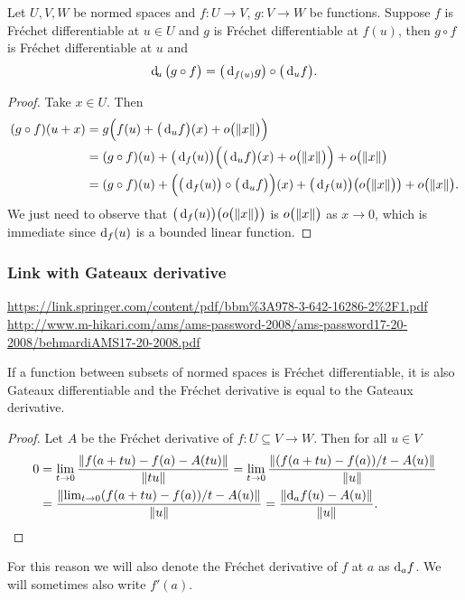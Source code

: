 \begin{proposition} \label{FrechetChainRule}
Let $U,V,W$ be normed spaces and $f: U\to V$, $g: V\to W$ be functions. Suppose $f$ is Fréchet differentiable at $u\in U$ and $g$ is Fréchet differentiable at $f(u)$, then $g\circ f$ is Fréchet differentiable at $u$ and
\[ \operatorname{d \!}_{u}\big(g\circ f\big) = \big(\operatorname{d \!}{_{f(u)}}g\big) \circ \big(\operatorname{d \!}{_u}f\big). \]
\end{proposition}
\begin{proof}
Take $x\in U$. Then
\begin{align*}
(g\circ f)(u+x) &= g\Big(f(u) + \big(\operatorname{d \!}{_uf}\big)(x) + o\big(\lVert x\rVert\big)\Big) \\
&= (g\circ f)(u) + \big(\operatorname{d \!}{_f(u)}\big)\Big(\big(\operatorname{d \!}{_uf}\big)(x) + o\big(\lVert x\rVert\big)\Big) + o\big(\lVert x\rVert\big) \\
&= (g\circ f)(u) + \Big(\big(\operatorname{d \!}{_f(u)}\big)\circ \big(\operatorname{d \!}{_uf}\big)\Big)(x) + \big(\operatorname{d \!}{_f(u)}\big)\big(o\big(\lVert x\rVert\big)\big) + o\big(\lVert x\rVert\big).
\end{align*}
We just need to observe that $\big(\operatorname{d \!}{_f(u)}\big)\big(o\big(\lVert x\rVert\big)\big)$ is $o\big(\lVert x\rVert\big)$ as $x\to 0$, which is immediate since $\operatorname{d \!}{_f(u)}$ is a bounded linear function.
\end{proof}

\subsubsection{Link with Gateaux derivative}
\url{https://link.springer.com/content/pdf/bbm%3A978-3-642-16286-2%2F1.pdf}
\url{http://www.m-hikari.com/ams/ams-password-2008/ams-password17-20-2008/behmardiAMS17-20-2008.pdf}
\begin{proposition}
If a function between subsets of normed spaces is Fréchet differentiable, it is also Gateaux differentiable and the Fréchet derivative is equal to the Gateaux derivative.
\end{proposition}
\begin{proof}
Let $A$ be the Fréchet derivative of $f: U\subseteq V\to W$. Then for all $u\in V$
\begin{align*}
0 &= \lim_{t\to 0} \frac{\lVert f(a+tu) - f(a) - A(tu)\rVert}{\lVert tu\rVert} = \lim_{t\to 0} \frac{\lVert(f(a+tu) - f(a))/t - A(u)\rVert}{\lVert u\rVert} \\
&= \frac{\lVert\lim_{t\to 0}(f(a+tu) - f(a))/t - A(u)\rVert}{\lVert u\rVert} = \frac{\lVert\operatorname{d \!}{_af}(u) - A(u)\rVert}{\lVert u\rVert}. 
\end{align*}
\end{proof}
For this reason we will also denote the Fréchet derivative of $f$ at $a$ as $\operatorname{d \!}{_a f}$. We will sometimes also write $f'(a)$.

